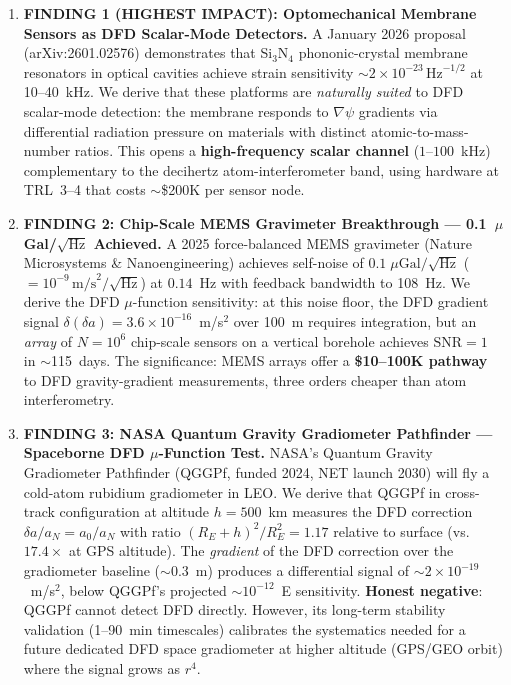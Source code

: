 \documentclass[11pt]{article}
\theoremstyle{definition}
\theoremstyle{remark}
\newcommand{\ee}[1]{\times10^{#1}}
\newcommand{\sqrtHz}{\,\mathrm{Hz}^{-1/2}}
\newcommand{\SNR}{\mathrm{SNR}}
\newcommand{\azero}{a_0}
\begin{document}
\begin{tcolorbox}[colback=blue!5!white, colframe=blue!60!black,
  title=\textbf{TOP 5 FINDINGS --- W4i13 P6 (Ranked by Impact)}]
\begin{enumerate}[nosep]

\item \textbf{FINDING 1 (HIGHEST IMPACT): Optomechanical Membrane Sensors as
  DFD Scalar-Mode Detectors.}
  A January 2026 proposal (arXiv:2601.02576) demonstrates that
  Si$_3$N$_4$ phononic-crystal membrane resonators in optical cavities
  achieve strain sensitivity $\sim 2\ee{-23}\sqrtHz$ at 10--40~kHz.
  We derive that these platforms are \emph{naturally suited} to DFD
  scalar-mode detection: the membrane responds to $\nabla\psi$
  gradients via differential radiation pressure on materials with
  distinct atomic-to-mass-number ratios. This opens a
  \textbf{high-frequency scalar channel} ($1$--$100$~kHz) complementary
  to the decihertz atom-interferometer band, using hardware at TRL~3--4
  that costs $\sim$\$200K per sensor node.

\item \textbf{FINDING 2: Chip-Scale MEMS Gravimeter Breakthrough ---
  0.1~$\mu$Gal/$\sqrt{\mathrm{Hz}}$ Achieved.}
  A 2025 force-balanced MEMS gravimeter (Nature Microsystems \&
  Nanoengineering) achieves self-noise of $0.1\;\mu\mathrm{Gal}/\sqrt{\mathrm{Hz}}$
  ($= 10^{-9}\,\mathrm{m/s}^2/\sqrt{\mathrm{Hz}}$) at $0.14$~Hz with
  feedback bandwidth to 108~Hz. We derive the DFD $\mu$-function
  sensitivity: at this noise floor, the DFD gradient signal
  $\delta(\delta a) = 3.6\ee{-16}$~m/s$^2$ over 100~m requires
  integration, but an \emph{array} of $N = 10^6$ chip-scale sensors
  on a vertical borehole achieves $\SNR = 1$ in $\sim$115~days.
  The significance: MEMS arrays offer a \textbf{\$10--100K pathway}
  to DFD gravity-gradient measurements, three orders cheaper than
  atom interferometry.

\item \textbf{FINDING 3: NASA Quantum Gravity Gradiometer Pathfinder ---
  Spaceborne DFD $\mu$-Function Test.}
  NASA's Quantum Gravity Gradiometer Pathfinder (QGGPf, funded 2024,
  NET launch 2030) will fly a cold-atom rubidium gradiometer in LEO.
  We derive that QGGPf in cross-track configuration at altitude
  $h = 500$~km measures the DFD correction $\delta a/a_N = \azero/a_N$
  with ratio $(R_E + h)^2/R_E^2 = 1.17$ relative to surface
  (vs.\ $17.4\times$ at GPS altitude). The \emph{gradient} of the
  DFD correction over the gradiometer baseline ($\sim 0.3$~m) produces
  a differential signal of $\sim 2\ee{-19}$~m/s$^2$, below QGGPf's
  projected $\sim 10^{-12}$~E sensitivity. \textbf{Honest negative}:
  QGGPf cannot detect DFD directly. However, its long-term stability
  validation (1--90~min timescales) calibrates the systematics needed
  for a future dedicated DFD space gradiometer at higher altitude
  (GPS/GEO orbit) where the signal grows as $r^4$.


\end{enumerate}
\end{tcolorbox}
\end{document}

